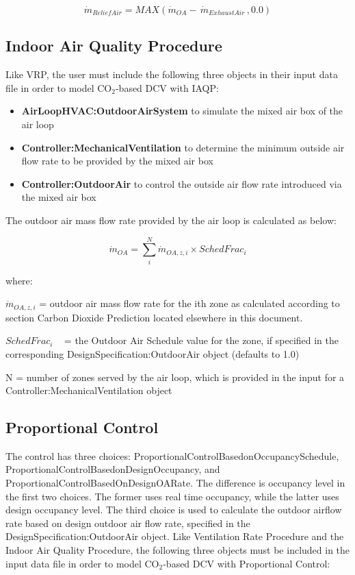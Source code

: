 \begin{equation}
{\dot m_{ReliefAir}} = MAX\left( {{{\dot m}_{OA}} - \,{{\dot m}_{ExhaustAir}}\,,0.0} \right)
\end{equation}

\subsection{Indoor Air Quality Procedure}\label{indoor-air-quality-procedure}

Like VRP, the user must include the following three objects in their input data file in order to model CO\(_{2}\)-based DCV with IAQP:

\begin{itemize}
  \item \textbf{AirLoopHVAC:OutdoorAirSystem} to simulate the mixed air box of the air loop
  \item \textbf{Controller:MechanicalVentilation} to determine the minimum outside air flow rate to be provided by the mixed air box
  \item \textbf{Controller:OutdoorAir} to control the outside air flow rate introduced via the mixed air box
\end{itemize}

The outdoor air mass flow rate provided by the air loop is calculated as below:

\begin{equation}
{\dot m_{OA}} = \sum\limits_i^N {{{\dot m}_{OA,z,i}} \times {SchedFrac_i}}
\end{equation}

where:

\({\dot m_{OA,z,i}}\) = outdoor air mass flow rate for the ith zone as calculated according to section Carbon Dioxide Prediction located elsewhere in this document.

\({SchedFrac_i}\) ~ = the Outdoor Air Schedule value for the zone, if specified in the corresponding DesignSpecification:OutdoorAir object (defaults to 1.0)

N = number of zones served by the air loop, which is provided in the input for a Controller:MechanicalVentilation object

\subsection{Proportional Control}\label{proportional-control}

The control has three choices: ProportionalControlBasedonOccupancySchedule,  ProportionalControlBasedonDesignOccupancy, and ProportionalControlBasedOnDesignOARate. The difference is occupancy level in the first two choices. The former uses real time occupancy, while the latter uses design occupancy level. The third choice is used to calculate the outdoor airflow rate based on design outdoor air flow rate, specified in the DesignSpecification:OutdoorAir object. Like Ventilation Rate Procedure and the Indoor Air Quality Procedure, the following three objects must be included in the input data file in order to model CO\(_{2}\)-based DCV with Proportional Control:

